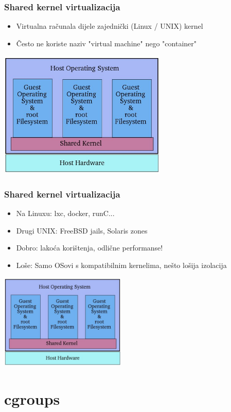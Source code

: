 \documentclass[t]{beamer}
\begin{document}
\begin{frame}
	\frametitle{Shared kernel virtualizacija}
	\centering
	\begin{itemize}
		\item Virtualna računala dijele zajednički (Linux / UNIX) kernel
    \item Često ne koriste naziv "virtual machine" nego "container"
	\end{itemize}
	\includegraphics[width=0.60\textwidth]{shared_virt.jpg}
\end{frame}

\begin{frame}
	\frametitle{Shared kernel virtualizacija}
	\centering
	\begin{itemize}
		\item Na Linuxu: lxc, docker, runC...
    \item Drugi UNIX: FreeBSD jails, Solaris zones
    \item Dobro: lakoća korištenja, odlične performanse!
    \item Loše: Samo OSovi s kompatibilnim kernelima, nešto lošija izolacija
	\end{itemize}
	\includegraphics[width=0.45\textwidth]{shared_virt.jpg}
\end{frame}


\section{cgroups}
\end{document}
